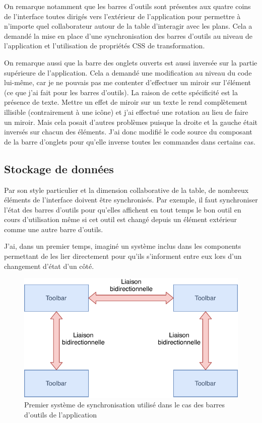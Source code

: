 On remarque notamment que les barres d'outils sont présentes aux quatre coins de l'interface toutes dirigés vers l'extérieur de l'application pour permettre à n'importe quel collaborateur autour de la table d'interagir avec les plans.
Cela a demandé la mise en place d'une synchronisation des barres d'outils au niveau de l'application et l'utilisation de propriétés CSS de transformation.

\bigskip

On remarque aussi que la barre des onglets ouverts est aussi inversée sur la partie supérieure de l'application.
Cela a demandé une modification au niveau du code lui-même, car je ne pouvais pas me contenter d'effectuer un miroir sur l'élément (ce que j'ai fait pour les barres d'outils).
La raison de cette spécificité est la présence de texte.
Mettre un effet de miroir sur un texte le rend complètement illisible (contrairement à une icône) et j'ai effectué une rotation au lieu de faire un miroir.
Mais cela posait d'autres problèmes puisque la droite et la gauche était inversés sur chacun des éléments.
J'ai donc modifié le code source du composant de la barre d'onglets pour qu'elle inverse toutes les commandes dans certains cas.

\subsection{Stockage de données}
\label{eiffageTablePlanStores}

Par son style particulier et la dimension collaborative de la table, de nombreux éléments de l'interface doivent être synchronisés.
Par exemple, il faut synchroniser l'état des barres d'outils pour qu'elles affichent en tout temps le bon outil en cours d'utilisation même si cet outil est changé depuis un élément extérieur comme une autre barre d'outils.

J'ai, dans un premier temps, imaginé un système inclus dans les components permettant de les lier directement pour qu'ils s'informent entre eux lors d'un changement d'état d'un côté.

\begin{figure}[h]
    \centering
    \includegraphics[scale=1]{img/premiere-synchro.pdf}
    \caption{Premier système de synchronisation utilisé dans le cas des barres d'outils de l'application}
\end{figure}

